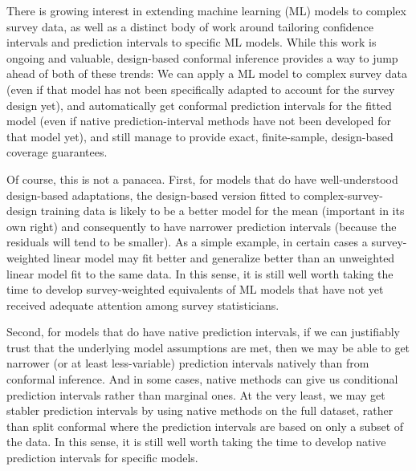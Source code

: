 \documentclass[10.5pt, letterpaper]{article}
\numberwithin{table}{section}
\numberwithin{figure}{section}
\numberwithin{equation}{section}
\begin{document}
There is growing interest in extending machine learning (ML) models to complex survey data, as well as a distinct body of work around tailoring confidence intervals and prediction intervals to specific ML models. While this work is ongoing and valuable, design-based conformal inference provides a way to jump ahead of both of these trends: We can apply a ML model to complex survey data (even if that model has not been specifically adapted to account for the survey design yet), and automatically get conformal prediction intervals for the fitted model (even if native prediction-interval methods have not been developed for that model yet), and still manage to provide exact, finite-sample, design-based coverage guarantees.


Of course, this is not a panacea.
First, for models that do have well-understood design-based adaptations, the design-based version fitted to complex-survey-design training data is likely to be a better model for the mean (important in its own right) and consequently to have narrower prediction intervals (because the residuals will tend to be smaller). As a simple example, in certain cases a survey-weighted linear model may fit better and generalize better than an unweighted linear model fit to the same data. In this sense, it is still well worth taking the time to develop survey-weighted equivalents of ML models that have not yet received adequate attention among survey statisticians.

Second, for models that do have native prediction intervals, if we can justifiably trust that the underlying model assumptions are met, then we may be able to get narrower (or at least less-variable) prediction intervals natively than from conformal inference. And in some cases, native methods can give us conditional prediction intervals rather than marginal ones.
At the very least, we may get stabler prediction intervals by using native methods on the full dataset, rather than split conformal where the prediction intervals are based on only a subset of the data.
In this sense, it is still well worth taking the time to develop native prediction intervals for specific models.
\end{document}
